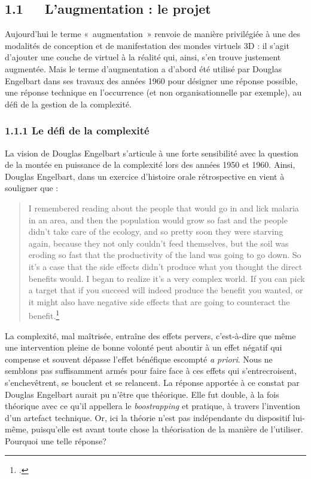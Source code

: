 \documentclass{FramateX}
\begin{document}
\begin{refsection}
\subsection*{1.1~~~L'augmentation : le projet}
{}


Aujourd'hui le terme «~augmentation~» renvoie de manière privilégiée à
une des modalités de conception et de manifestation des mondes virtuels
3D : il s'agit d'ajouter une couche de virtuel à la réalité qui, ainsi,
s'en trouve justement augmentée. Mais le terme d'augmentation a d'abord
été utilisé par Douglas Engelbart dans ses travaux des années 1960 pour
désigner une réponse possible, une réponse technique en l'occurrence
(et non organisationnelle par exemple), au défi de la gestion de la
complexité.

\subsubsection*{1.1.1 Le défi de la complexité}
{}

La vision de Douglas Engelbart s'articule à une forte sensibilité avec la
question de la montée en puissance de la complexité lors des années
1950 et 1960. Ainsi, Douglas Engelbart, dans un exercice d'histoire orale
rétrospective en vient à souligner que :
\begin{quote}
I remembered reading about
the people that would go in and lick malaria in an area, and then the
population would grow so fast and the people didn't
take care of the ecology, and so pretty soon they were starving again,
because they not only couldn't feed themselves, but
the soil was eroding so fast that the productivity of the land was
going to go down. So it's a case that the side effects
didn't produce what you thought the direct benefits
would. I began to realize it's a very complex world.
If you can pick a target that if you succeed will indeed produce the
benefit you wanted, or it might also have negative side effects that
are going to counteract the benefit.\footnote{\cite[p.~10]{bardinibootstrapping2001}.}
\end{quote}

 La complexité, mal maîtrisée, entraîne des effets pervers, c'est-à-dire
que même une intervention pleine de bonne volonté peut aboutir à un
effet négatif qui compense et souvent dépasse l'effet bénéfique
escompté \textit{a priori}. Nous ne semblons pas suffisamment armés pour faire
face à ces effets qui s'entrecroisent, s'enchevêtrent, se bouclent et
se relancent. La réponse apportée à ce constat par Douglas Engelbart
aurait pu n'être que théorique. Elle fut double, à la fois théorique
avec ce qu'il appellera le \textit{boostrapping} et pratique, à travers
l'invention d'un artefact technique. Or, ici la théorie n'est pas
indépendante du dispositif lui-même, puisqu'elle est avant toute chose
la théorisation de la manière de l'utiliser. Pourquoi une telle réponse?


\end{refsection}
\end{document}
